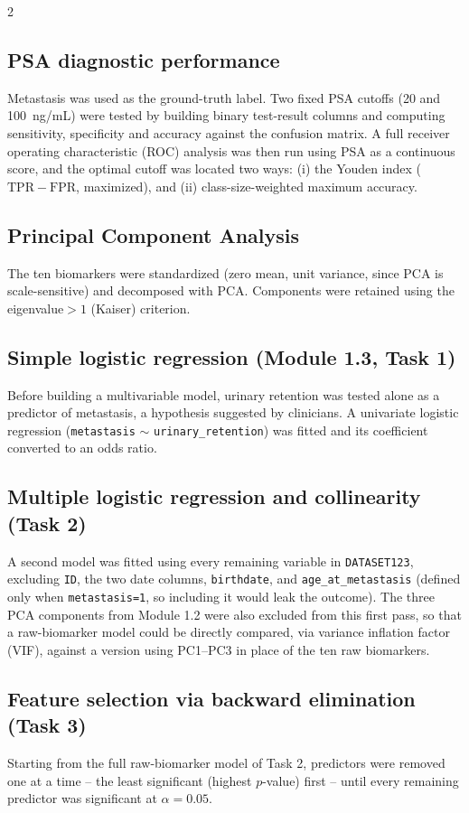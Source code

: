 ﻿\documentclass[a4paper,10pt]{article}
\begin{document}
\begin{multicols*}{2}
\subsection{PSA diagnostic performance}
Metastasis was used as the ground-truth label. Two fixed PSA cutoffs (20 and 100~ng/mL) were tested by building binary test-result columns and computing sensitivity, specificity and accuracy against the confusion matrix. A full receiver operating characteristic (ROC) analysis was then run using PSA as a continuous score, and the optimal cutoff was located two ways: (i) the Youden index ($\mathrm{TPR}-\mathrm{FPR}$, maximized), and (ii) class-size-weighted maximum accuracy.

\subsection{Principal Component Analysis}
The ten biomarkers were standardized (zero mean, unit variance, since PCA is scale-sensitive) and decomposed with PCA. Components were retained using the eigenvalue$>1$ (Kaiser) criterion.

\subsection{Simple logistic regression (Module 1.3, Task 1)}
Before building a multivariable model, urinary retention was tested alone as a predictor of metastasis, a hypothesis suggested by clinicians. A univariate logistic regression (\texttt{metastasis} $\sim$ \texttt{urinary\_retention}) was fitted and its coefficient converted to an odds ratio.

\subsection{Multiple logistic regression and collinearity (Task 2)}
A second model was fitted using every remaining variable in \texttt{DATASET123}, excluding \texttt{ID}, the two date columns, \texttt{birthdate}, and \texttt{age\_at\_metastasis} (defined only when \texttt{metastasis=1}, so including it would leak the outcome). The three PCA components from Module 1.2 were also excluded from this first pass, so that a raw-biomarker model could be directly compared, via variance inflation factor (VIF), against a version using PC1--PC3 in place of the ten raw biomarkers.

\subsection{Feature selection via backward elimination (Task 3)}
Starting from the full raw-biomarker model of Task 2, predictors were removed one at a time -- the least significant (highest $p$-value) first -- until every remaining predictor was significant at $\alpha=0.05$.


\end{multicols*}
\end{document}
